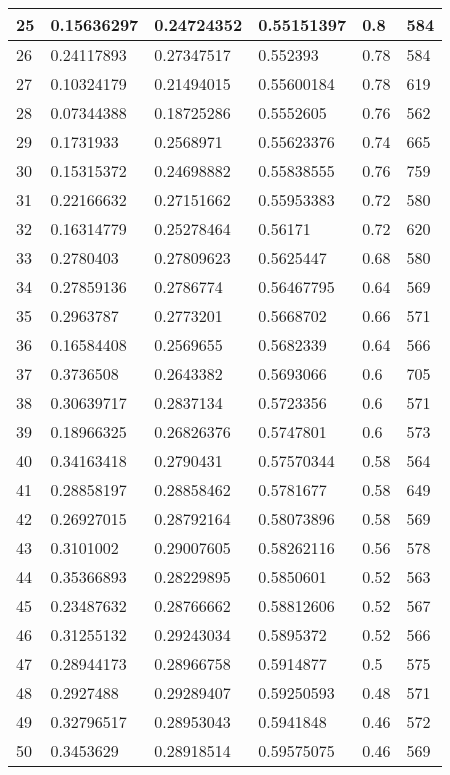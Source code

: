 \begin{longtable}{|l|l|l|l|l|l|}
25 & 0.15636297 & 0.24724352 & 0.55151397 & 0.8 & 584 \\ \hline 
26 & 0.24117893 & 0.27347517 & 0.552393 & 0.78 & 584 \\ \hline 
27 & 0.10324179 & 0.21494015 & 0.55600184 & 0.78 & 619 \\ \hline 
28 & 0.07344388 & 0.18725286 & 0.5552605 & 0.76 & 562 \\ \hline 
29 & 0.1731933 & 0.2568971 & 0.55623376 & 0.74 & 665 \\ \hline 
30 & 0.15315372 & 0.24698882 & 0.55838555 & 0.76 & 759 \\ \hline 
31 & 0.22166632 & 0.27151662 & 0.55953383 & 0.72 & 580 \\ \hline 
32 & 0.16314779 & 0.25278464 & 0.56171 & 0.72 & 620 \\ \hline 
33 & 0.2780403 & 0.27809623 & 0.5625447 & 0.68 & 580 \\ \hline 
34 & 0.27859136 & 0.2786774 & 0.56467795 & 0.64 & 569 \\ \hline 
35 & 0.2963787 & 0.2773201 & 0.5668702 & 0.66 & 571 \\ \hline 
36 & 0.16584408 & 0.2569655 & 0.5682339 & 0.64 & 566 \\ \hline 
37 & 0.3736508 & 0.2643382 & 0.5693066 & 0.6 & 705 \\ \hline 
38 & 0.30639717 & 0.2837134 & 0.5723356 & 0.6 & 571 \\ \hline 
39 & 0.18966325 & 0.26826376 & 0.5747801 & 0.6 & 573 \\ \hline 
40 & 0.34163418 & 0.2790431 & 0.57570344 & 0.58 & 564 \\ \hline 
41 & 0.28858197 & 0.28858462 & 0.5781677 & 0.58 & 649 \\ \hline 
42 & 0.26927015 & 0.28792164 & 0.58073896 & 0.58 & 569 \\ \hline 
43 & 0.3101002 & 0.29007605 & 0.58262116 & 0.56 & 578 \\ \hline 
44 & 0.35366893 & 0.28229895 & 0.5850601 & 0.52 & 563 \\ \hline 
45 & 0.23487632 & 0.28766662 & 0.58812606 & 0.52 & 567 \\ \hline 
46 & 0.31255132 & 0.29243034 & 0.5895372 & 0.52 & 566 \\ \hline 
47 & 0.28944173 & 0.28966758 & 0.5914877 & 0.5 & 575 \\ \hline 
48 & 0.2927488 & 0.29289407 & 0.59250593 & 0.48 & 571 \\ \hline 
49 & 0.32796517 & 0.28953043 & 0.5941848 & 0.46 & 572 \\ \hline 
50 & 0.3453629 & 0.28918514 & 0.59575075 & 0.46 & 569 \\ \hline 
\end{longtable}